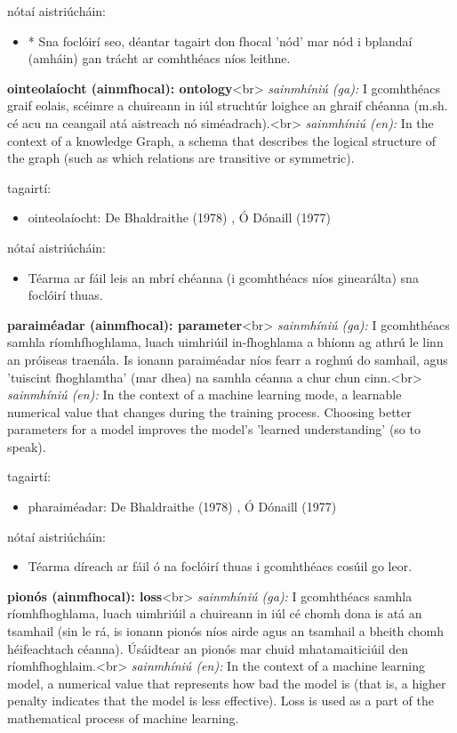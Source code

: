 \documentclass{article}
\begin{document}
nótaí aistriúcháin:
\begin{itemize}
	\item * Sna foclóirí seo, déantar tagairt don fhocal 'nód' mar nód i bplandaí (amháin) gan trácht ar comhthéacs níos leithne.
\end{itemize}


\textbf{ointeolaíocht (ainmfhocal): ontology}<br>
\textit{sainmhíniú (ga):} I gcomhthéacs graif eolais, scéimre a chuireann in iúl struchtúr loighce an ghraif chéanna (m.sh. cé acu na ceangail atá aistreach nó siméadrach).<br>
\textit{sainmhíniú (en):} In the context of a knowledge Graph, a schema that describes the logical structure of the graph (such as which relations are transitive or symmetric).

tagairtí:
\begin{itemize}
	\item ointeolaíocht: De Bhaldraithe (1978) \cite{de-bhaldraithe}, Ó Dónaill (1977) \cite{odonaill}
\end{itemize}

nótaí aistriúcháin:
\begin{itemize}
	\item Téarma ar fáil leis an mbrí chéanna (i gcomhthéacs níos ginearálta) sna foclóirí thuas.
\end{itemize}


\textbf{paraiméadar (ainmfhocal): parameter}<br>
\textit{sainmhíniú (ga):} I gcomhthéacs samhla ríomhfhoghlama, luach uimhriúil in-fhoghlama a bhíonn ag athrú le linn an próiseas traenála. Is ionann paraiméadar níos fearr a roghnú do samhail, agus 'tuiscint fhoghlamtha' (mar dhea) na samhla céanna a chur chun cinn.<br>
\textit{sainmhíniú (en):} In the context of a machine learning mode, a learnable numerical value that changes during the training process. Choosing better parameters for a model improves the model's 'learned understanding' (so to speak).

tagairtí:
\begin{itemize}
	\item pharaiméadar: De Bhaldraithe (1978) \cite{de-bhaldraithe}, Ó Dónaill (1977) \cite{odonaill}
\end{itemize}

nótaí aistriúcháin:
\begin{itemize}
	\item Téarma díreach ar fáil ó na foclóirí thuas i gcomhthéacs cosúil go leor.
\end{itemize}


\textbf{pionós (ainmfhocal): loss}<br>
\textit{sainmhíniú (ga):} I gcomhthéacs samhla ríomhfhoghlama, luach uimhriúil a chuireann in iúl cé chomh dona is atá an tsamhail (sin le rá, is ionann pionós níos airde agus an tsamhail a bheith chomh héifeachtach céanna). Úsáidtear an pionós mar chuid mhatamaiticiúil den ríomhfhoghlaim.<br>
\textit{sainmhíniú (en):} In the context of a machine learning model, a numerical value that represents how bad the model is (that is, a higher penalty indicates that the model is less effective). Loss is used as a part of the mathematical process of machine learning.
\end{document}
